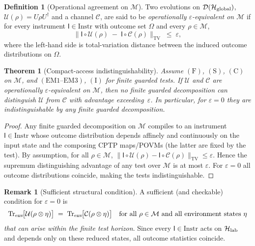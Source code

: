 \documentclass[12pt]{article}
\theoremstyle{definition}
\newtheorem{definition}{Definition}[section]
\newtheorem{remark}{Remark}[section]
\theoremstyle{plain}
\newtheorem{theorem}{Theorem}[section]
\begin{document}
\begin{definition}[Operational agreement on $\mathcal M$]
Two evolutions on $\mathcal D(\mathcal H_{\rm global})$,
\(
\mathcal U(\rho)=U\rho U^\dagger
\)
and a channel $\mathcal C$, are said to be \emph{operationally $\varepsilon$-equivalent on $\mathcal M$}
if for every instrument $\mathsf I\in\mathrm{Instr}$ with outcome set $\Omega$ and every $\rho\in\mathcal M$,
\[
\bigl\|\mathsf I\circ \mathcal U(\rho)\;-\;\mathsf I\circ \mathcal C(\rho)\bigr\|_{\mathrm{TV}}
\;\le\;\varepsilon,
\]
where the left-hand side is total-variation distance between the induced outcome distributions on $\Omega$.
\end{definition}

\begin{theorem}[Compact-access indistinguishability]\label{thm:compact-indistinguishability}
Assume $(\mathrm F)$, $(\mathrm S)$, $(\mathrm C)$ on $\mathcal M$, and $(\mathrm{EM1}\text{–}\mathrm{EM3})$, $(\mathrm I)$ for finite guarded tests. If $\mathcal U$ and $\mathcal C$ are operationally $\varepsilon$-equivalent on $\mathcal M$, then no finite guarded decomposition can distinguish $\mathcal U$ from $\mathcal C$ with advantage exceeding~$\varepsilon$. In particular, for $\varepsilon=0$ they are indistinguishable by any finite guarded decomposition.
\end{theorem}

\begin{proof}
Any finite guarded decomposition on $\mathcal M$ compiles to an instrument $\mathsf I\in\mathrm{Instr}$ whose outcome distribution depends affinely and continuously on the input state and the composing CPTP maps/POVMs (the latter are fixed by the test). By assumption, for all $\rho\in\mathcal M$,
\(
\|\mathsf I\circ \mathcal U(\rho) - \mathsf I\circ \mathcal C(\rho)\|_{\mathrm{TV}}\le\varepsilon.
\)
Hence the supremum distinguishing advantage of any test over $\mathcal M$ is at most $\varepsilon$. For $\varepsilon=0$ all outcome distributions coincide, making the tests indistinguishable.
\end{proof}

\begin{remark}[Sufficient structural condition]
A sufficient (and checkable) condition for $\varepsilon=0$ is
\[
\operatorname{Tr}_{\rm env}\!\bigl[\mathcal U(\rho\otimes \eta)\bigr]
\;=\;
\operatorname{Tr}_{\rm env}\!\bigl[\mathcal C(\rho\otimes \eta)\bigr]
\quad
\text{for all }\rho\in\mathcal M\text{ and all environment states }\eta
\]
\emph{that can arise within the finite test horizon}. Since every $\mathsf I\in\mathrm{Instr}$ acts on $\mathcal H_{\rm lab}$ and depends only on these reduced states, all outcome statistics coincide.
\end{remark}
\end{document}
